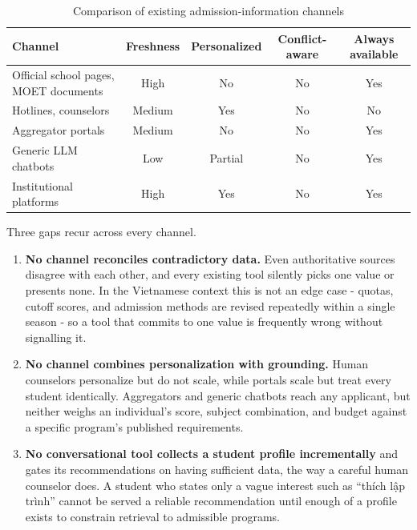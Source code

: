 \documentclass[../main.tex]{subfiles}
\begin{document}
\begin{table}[H]
    \centering
    \caption{Comparison of existing admission-information channels}
    \label{table:channel-comparison}
    {\footnotesize
    \setlength{\tabcolsep}{4pt}
    \begin{tabular}{|p{3.4cm}|c|c|c|c|}
        \hline
        \textbf{Channel} & \textbf{Freshness} & \textbf{Personalized} & \textbf{Conflict-aware} & \textbf{Always available} \\
        \hline
        Official school pages, \gls{MOET} documents & High & No & No & Yes \\
        \hline
        Hotlines, counselors & Medium & Yes & No & No \\
        \hline
        Aggregator portals & Medium & No & No & Yes \\
        \hline
        Generic \gls{LLM} chatbots & Low & Partial & No & Yes \\
        \hline
        Institutional platforms & High & Yes & No & Yes \\
        \hline
    \end{tabular}}
\end{table}

Three gaps recur across every channel.

\begin{enumerate}
    \item \textbf{No channel reconciles contradictory data.} Even authoritative sources disagree with each other, and every existing tool silently picks one value or presents none. In the Vietnamese context this is not an edge case - quotas, cutoff scores, and admission methods are revised repeatedly within a single season - so a tool that commits to one value is frequently wrong without signalling it.
    \item \textbf{No channel combines personalization with grounding.} Human counselors personalize but do not scale, while portals scale but treat every student identically. Aggregators and generic chatbots reach any applicant, but neither weighs an individual's score, subject combination, and budget against a specific program's published requirements.
    \item \textbf{No conversational tool collects a student profile incrementally} and gates its recommendations on having sufficient data, the way a careful human counselor does. A student who states only a vague interest such as ``thích lập trình'' cannot be served a reliable recommendation until enough of a profile exists to constrain retrieval to admissible programs.
\end{enumerate}
\end{document}
